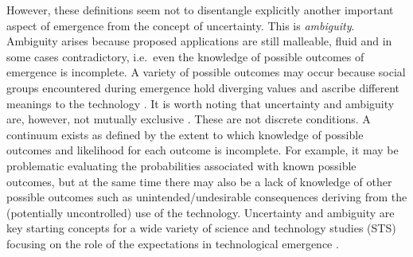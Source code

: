 \documentclass[11pt]{article}
\begin{document}
However, these definitions seem not to disentangle explicitly another important aspect of emergence from the concept of uncertainty. This is \textit{ambiguity}. Ambiguity arises because proposed applications are still malleable, fluid and in some cases contradictory, i.e.\ even the knowledge of possible outcomes of emergence is incomplete.  A variety of possible outcomes may occur because social groups encountered during emergence hold diverging values and ascribe different meanings to the technology \citep{Mitchell2007}. It is worth noting that uncertainty and ambiguity are, however, not mutually exclusive \citep{Stirling2007a}. These are not discrete conditions. A continuum exists as defined by the extent to which knowledge of possible outcomes and likelihood for each outcome is incomplete. For example, it may be problematic evaluating the probabilities associated with known possible outcomes, but at the same time there may also be a lack of knowledge of other possible outcomes such as unintended/undesirable consequences deriving from the (potentially uncontrolled) use of the technology. Uncertainty and ambiguity are key starting concepts for a wide variety of science and technology studies (STS) focusing on the role of the expectations in technological emergence \citep[e.g.][]{VanLente1998}.
\end{document}
